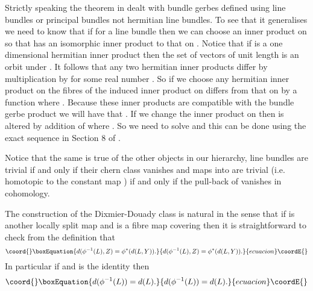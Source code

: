 \documentclass[a4paper,reqno]{amsart}
\theoremstyle{plain}
\theoremstyle{definition}
\theoremstyle{remark}
\numberwithin{equation}{section}
\numberwithin{figure}{section}
\providecommand{\CC}{{\mathbb C}}
\providecommand{\RR}{{\mathbb R}}
\providecommand{\<}{\langle}
\renewcommand{\>}{\rangle}
\begin{document}
Strictly speaking the theorem in \cite{Mur} dealt with bundle gerbes defined
using line bundles or \myHighlight{$\CC^\times$}\coordHE{} principal bundles not hermitian
line bundles.  To see
that it generalises we need to know that if \coordHE{} for \coordHE{} a line
bundle then we can choose an inner product on \coordHE{} so that \coordHE{} has an
isomorphic inner product to that on \coordHE{}.  Notice that if \coordHE{} is a
one dimensional hermitian inner product then the set of vectors of
unit length is an orbit under \coordHE{}. It follows that any two hermitian
inner products differ by multiplication by \coordHE{} for some
real number \myHighlight{$\lambda$}\coordHE{}.  So if we choose any
hermitian inner product on the fibres of \coordHE{} the induced inner product
on \coordHE{} differs from that on \coordHE{} by a function \coordHE{}
where \coordHE{}.
Because these inner products are compatible with the bundle gerbe
product we will
have that \coordHE{}.
If we change the inner product on \coordHE{} then \coordHE{} is altered by addition
of \coordHE{} where \myHighlight{$h \colon Y \to
\RR$}\coordHE{}.  So we need to solve
\coordHE{} and this can be done using the exact sequence  in
Section 8 of \cite{Mur}.

Notice that the same is true of the other objects in our hierarchy,
line bundles
are trivial if and only if their chern class vanishes and maps into
\coordHE{} are
trivial (i.e. homotopic to the constant map \coordHE{}) if and only if the pull-back
of \coordHE{} vanishes in cohomology.

The construction
of the Dixmier-Douady class is natural in the sense that
if \coordHE{} is another locally split map
and \coordHE{} is a  fibre map covering
\coordHE{} then it is straightforward to
check from the definition that
\begin{equation}\coord{}\boxEquation{
\label{eq:natural0}
d(\phi^{-1}(L), Z) = \phi^*(d(L, Y)).
}{
d(\phi^{-1}(L), Z) = \phi^*(d(L, Y)).
}{ecuacion}\coordE{}\end{equation}
In particular if \coordHE{} and \myHighlight{$\phi $}\coordHE{} is the identity
then
\begin{equation}\coord{}\boxEquation{
\label{eq:natural1}
d(\phi^{-1}(L)) = d(L).
}{
d(\phi^{-1}(L)) = d(L).
}{ecuacion}\coordE{}\end{equation}
\end{document}
